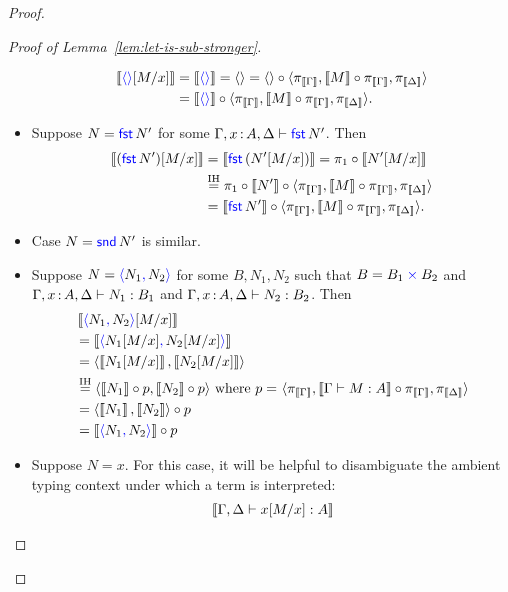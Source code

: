\begin{proof}
\begin{proof}[Proof of Lemma~\ref{lem:let-is-sub-stronger}]
\begin{itemize}
\begin{align*}
        \left\llbracket {{\color{blue}\langle \rangle}}[M/x]\right\rrbracket &= \left\llbracket {{\color{blue}\langle \rangle}}\right\rrbracket = \langle \rangle
        = \langle \rangle \circ \langle \pi_{\left\llbracket \Gamma\right\rrbracket}, \left\llbracket M\right\rrbracket\circ\pi_{\left\llbracket \Gamma\right\rrbracket}, \pi_{\left\llbracket \Delta\right\rrbracket}\rangle \\
        &= \left\llbracket {{\color{blue}\langle \rangle}}\right\rrbracket \circ \langle \pi_{\left\llbracket \Gamma\right\rrbracket}, \left\llbracket M\right\rrbracket\circ\pi_{\left\llbracket \Gamma\right\rrbracket}, \pi_{\left\llbracket \Delta\right\rrbracket}\rangle.
      \end{align*}
    \item Suppose \(N = \mathsf{{\color{blue}fst}}\,N'\) for some \(\Gamma,x\,{:}\, A,\Delta \vdash \mathsf{{\color{blue}fst}}\,N'\).
      Then
      \begin{align*}
        \left\llbracket (\mathsf{{\color{blue}fst}}\,N')[M/x]\right\rrbracket
        &= \left\llbracket \mathsf{{\color{blue}fst}}\,(N'[M/x])\right\rrbracket
        = \pi_1 \circ \left\llbracket N'[M/x]\right\rrbracket \\
        &\stackrel{\text{IH}}=
        \pi_1 \circ \left\llbracket N'\right\rrbracket \circ \langle \pi_{\left\llbracket \Gamma\right\rrbracket}, \left\llbracket M\right\rrbracket\circ\pi_{\left\llbracket \Gamma\right\rrbracket}, \pi_{\left\llbracket \Delta\right\rrbracket}\rangle \\
        &= \left\llbracket \mathsf{{\color{blue}fst}}\,N'\right\rrbracket \circ\langle \pi_{\left\llbracket \Gamma\right\rrbracket}, \left\llbracket M\right\rrbracket\circ\pi_{\left\llbracket \Gamma\right\rrbracket}, \pi_{\left\llbracket \Delta\right\rrbracket}\rangle.
      \end{align*}
    \item Case \(N = \mathsf{{\color{blue}snd}}\,N'\) is similar.
    \item Suppose \(N = \plpair{N_1}{N_2}\) for some \(B,N_1,N_2\) such that \(B = B_1\mathbin{{\color{blue}\times}} B_2\) and
      \(\Gamma,x\,{:}\, A,\Delta \vdash N_1 : B_1\)
      and \(\Gamma,x\,{:}\, A,\Delta \vdash N_2 : B_2\).
      Then
      \begin{align*}
        &\llbr{\plpair{N_1}{N_2}[M/x]}
        \\
        &=
        \llbr{\plpair{N_1[M/x]}{N_2[M/x]}}
        \\
        &=
        \angled{\llbr{N_1[M/x]},\llbr{N_2[M/x]}}
        \\
        &\stackrel{\text{IH}}=
        \angled{\llbr{N_1}\circ p,\llbr{N_2} \circ p}
        \text{ where \(p =\) }\angled{\pi_{\llbr{\Gamma}},
          \llbr{\Gamma \vdash M : A}\circ\pi_{\llbr{\Gamma}},
          \pi_{\llbr{\Delta}}}
        \\
        &= \angled{\llbr{N_1},\llbr{N_2}} \circ p\\
        &= \llbr{\plpair{N_1}{N_2}} \circ p
      \end{align*}
    \item Suppose \(N = x\).
      For this case, it will be helpful to disambiguate the ambient typing context under which a term is interpreted:
      \begin{align*}
        &\llbr{\Gamma,\Delta \vdash x[M/x] : A} \\

\end{align*}
\end{itemize}
\end{proof}
\end{proof}
